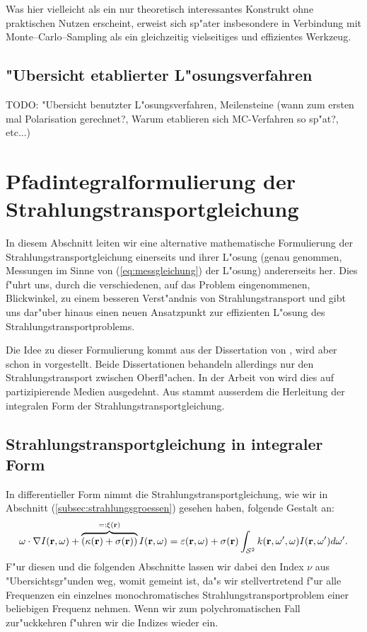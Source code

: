 	Was hier vielleicht als ein nur theoretisch interessantes Konstrukt ohne praktischen Nutzen erscheint, erweist sich sp"ater insbesondere in Verbindung mit Monte--Carlo--Sampling als ein gleichzeitig vielseitiges und effizientes Werkzeug.	
	
	
	\subsection{"Ubersicht etablierter L"osungsverfahren}
	TODO: "Ubersicht benutzter L"osungsverfahren, Meilensteine (wann zum ersten mal Polarisation gerechnet?, Warum etablieren sich MC-Verfahren so sp"at?, etc...)
		
	\section{Pfadintegralformulierung der Strahlungstransportgleichung}
	In diesem Abschnitt leiten wir eine alternative mathematische Formulierung der Strahlungstransportgleichung einerseits und ihrer L"osung (genau genommen, Messungen im Sinne von (\ref{eq:messgleichung}) der L"osung) andererseits her. Dies f"uhrt uns, durch die verschiedenen, auf das Problem eingenommenen, Blickwinkel, zu einem besseren Verst"andnis von Strahlungstransport und gibt uns dar"uber hinaus einen neuen Ansatzpunkt zur effizienten L"osung des Strahlungstransportproblems.
	
	Die Idee zu dieser Formulierung kommt aus der Dissertation von \citet{Veach:1997p9136}, wird aber schon in \citep{Arvo:1995p9257} vorgestellt. Beide Dissertationen behandeln allerdings nur den Strahlungstransport zwischen Oberfl"achen. In der Arbeit von \citet{Pauly:2000p5705} wird dies auf partizipierende Medien ausgedehnt. Aus \citep{Arvo:1993p9035} stammt ausserdem die Herleitung der integralen Form der Strahlungstransportgleichung.
	
	
	\subsection{Strahlungstransportgleichung in integraler Form}
	In differentieller Form nimmt die Strahlungstransportgleichung, wie wir in Abschnitt (\ref{subsec:strahlungsgroessen}) gesehen haben, folgende Gestalt an:
		\begin{equation}
			\omega \cdot \nabla I(\mathbf{r},\omega)+\overbrace{\left(\kappa(\mathbf{r})+\sigma(\mathbf{r})\right)}^{=:\xi(\mathbf{r})}I(\mathbf{r},\omega)=\varepsilon(\mathbf{r},\omega)+\sigma(\mathbf{r}) \int_{\mathcal{S}^2} k(\mathbf{r},\omega',\omega)I(\mathbf{r},\omega') d\omega'.
			\label{eq:diff.STG}
		\end{equation}
	F"ur diesen und die folgenden Abschnitte lassen wir dabei den Index $\nu$ aus "Ubersichtsgr"unden weg, womit gemeint ist, da"s wir stellvertretend f"ur alle Frequenzen ein einzelnes monochromatisches Strahlungstransportproblem einer beliebigen Frequenz nehmen. Wenn wir zum polychromatischen Fall zur"uckkehren f"uhren wir die Indizes wieder ein.
	
